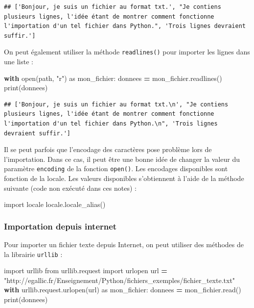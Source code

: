 \documentclass[12pt,]{book}
\newenvironment{Shaded}{\begin{snugshade}}{\end{snugshade}}
\newcommand{\StringTok}[1]{\textcolor[rgb]{0.31,0.60,0.02}{#1}}
\newcommand{\ImportTok}[1]{#1}
\newcommand{\ControlFlowTok}[1]{\textcolor[rgb]{0.13,0.29,0.53}{\textbf{#1}}}
\newcommand{\OperatorTok}[1]{\textcolor[rgb]{0.81,0.36,0.00}{\textbf{#1}}}
\newcommand{\BuiltInTok}[1]{#1}
\newcommand{\NormalTok}[1]{#1}
\numberwithin{equation}{section}
\numberwithin{countremarque}{section}
\begin{document}
\begin{lstlisting}
## ['Bonjour, je suis un fichier au format txt.', "Je contiens plusieurs lignes, l'idée étant de montrer comment fonctionne l'importation d'un tel fichier dans Python.", 'Trois lignes devraient suffir.']
\end{lstlisting}

On peut également utiliser la méthode \texttt{readlines()} pour importer
les lignes dans une liste :

\begin{Shaded}
\begin{Highlighting}[]
\ControlFlowTok{with} \BuiltInTok{open}\NormalTok{(path, }\StringTok{"r"}\NormalTok{) }\ImportTok{as}\NormalTok{ mon_fichier:}
\NormalTok{    donnees }\OperatorTok{=}\NormalTok{ mon_fichier.readlines()}
\BuiltInTok{print}\NormalTok{(donnees)}
\end{Highlighting}
\end{Shaded}

\begin{lstlisting}
## ['Bonjour, je suis un fichier au format txt.\n', "Je contiens plusieurs lignes, l'idée étant de montrer comment fonctionne l'importation d'un tel fichier dans Python.\n", 'Trois lignes devraient suffir.']
\end{lstlisting}

Il se peut parfois que l'encodage des caractères pose problème lors de
l'importation. Dans ce cas, il peut être une bonne idée de changer la
valeur du paramètre \texttt{encoding} de la fonction \texttt{open()}.
Les encodages disponibles sont fonction de la locale. Les valeurs
disponibles s'obtiennent à l'aide de la méthode suivante (code non
exécuté dans ces notes) :

\begin{Shaded}
\begin{Highlighting}[]
\ImportTok{import}\NormalTok{ locale}
\NormalTok{locale.locale_alias()}
\end{Highlighting}
\end{Shaded}

\subsubsection{Importation depuis
internet}\label{importation-depuis-internet}

Pour importer un fichier texte depuis Internet, on peut utiliser des
méthodes de la librairie \texttt{urllib} :

\begin{Shaded}
\begin{Highlighting}[]
\ImportTok{import}\NormalTok{ urllib}
\ImportTok{from}\NormalTok{ urllib.request }\ImportTok{import}\NormalTok{ urlopen}
\NormalTok{url }\OperatorTok{=} \StringTok{"http://egallic.fr/Enseignement/Python/fichiers_exemples/fichier_texte.txt"}
\ControlFlowTok{with}\NormalTok{ urllib.request.urlopen(url) }\ImportTok{as}\NormalTok{ mon_fichier:}
\NormalTok{   donnees }\OperatorTok{=}\NormalTok{ mon_fichier.read()}
\BuiltInTok{print}\NormalTok{(donnees)}
\end{Highlighting}
\end{Shaded}
\end{document}

